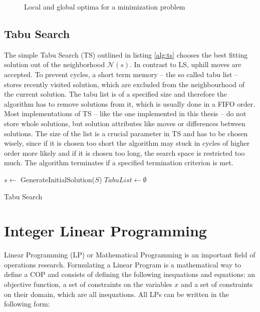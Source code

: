 \begin{center}
\begin{figure}
\caption{Local and global optima for a minimization problem}
\end{figure}
\end{center}


\subsection{Tabu Search}
\label{sec:ts}
The simple Tabu Search (TS) outlined in listing \ref{alg:ts} chooses the best fitting solution out of the neighborhood $\mathcal{N}(s)$. In contrast to LS, uphill moves are accepted. To prevent cycles, a short term memory -- the so called tabu list -- stores recently visited solution, which are excluded from the neighbourhood of the current solution. The tabu list is of a specified size and therefore the algorithm has to remove solutions from it, which is usually done in a FIFO order. Most implementations of TS -- like the one implemented in this thesis -- do not store whole solutions, but solution attributes like moves or differences between solutions. The size of the list is a crucial parameter in TS and has to be chosen wisely, since if it is chosen too short the algorithm may stuck in cycles of higher order more likely and if it is chosen too long, the search space is restricted too much. The algorithm terminates if a specified termination criterion is met.\\

\begin{algorithm}[h]
$s \gets$ GenerateInitialSolution($S$)\;
$TabuList \gets \emptyset$\;
\caption{Tabu Search}
\label{alg:ts}
\end{algorithm}


\section{Integer Linear Programming}
Linear Programming (LP) or Mathematical Programming is an important field of operations research. Formulating a Linear Program is a mathematical way to define a COP and consists of defining the following inequations and equations: an objective function, a set of constraints on the variables $x$ and a set of constraints on their domain, which are all inequations.  All LPs can be written in the following form:


